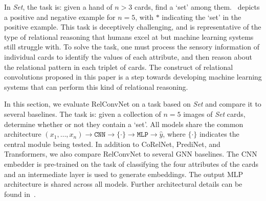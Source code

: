 
In \textit{Set}, the task is: given a hand of $n > 3$ cards, find a `set' among them.~ depicts a positive and negative example for $n=5$, with $*$ indicating the `set' in the positive example.
This task is deceptively challenging, and is representative of the type of relational reasoning that humans excel at but machine learning systems still struggle with. To solve the task, one must process the sensory information of individual cards to identify the values of each attribute, and then reason about the relational pattern in each triplet of cards.
The construct of relational convolutions proposed in this paper is a step towards developing machine learning systems that can perform this kind of relational reasoning.


In this section, we evaluate RelConvNet on a task based on \textit{Set} and compare it to several baselines. The task is: given a collection of $n=5$ images of \textit{Set} cards, determine whether or not they contain a `set'. All models share the common architecture $(x_1, \ldots, x_n) \to \texttt{CNN} \to \{ \cdot \} \to \texttt{MLP} \to \hat{y}$, where $\{\cdot\}$ indicates the central module being tested. In addition to CoRelNet, PrediNet, and Transformers, we also compare RelConvNet to several GNN baselines. The CNN embedder is pre-trained on the task of classifying the four attributes of the cards and an intermediate layer is used to generate embeddings. The output MLP architecture is shared across all models.
Further architectural details can be found in~. 

